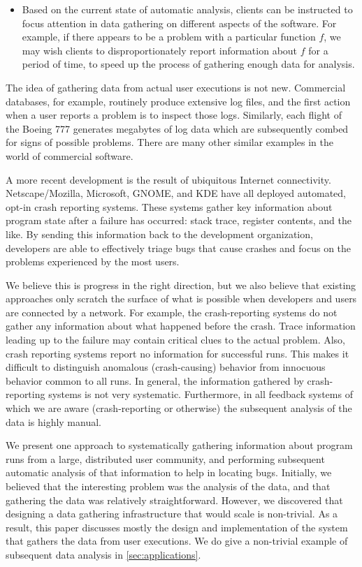 \begin{itemize}
\item Based on the current state of automatic analysis, clients can be
instructed to focus attention in data gathering on different aspects
of the software.  For example, if there appears to be a problem
with a particular function $f$, we may wish clients to disproportionately
report information about $f$ for a period of time, to speed up
the process of gathering enough data for analysis.

\end{itemize}

The idea of gathering data from actual user executions is not new.
Commercial databases, for example, routinely produce extensive
log files, and the first action when a user reports a problem is
to inspect those logs.  Similarly, each flight of the Boeing 777
generates megabytes of log data which are subsequently combed
for signs of possible problems.  There are many other similar
examples in the world of commercial software.

A more recent development is the result of ubiquitous Internet
connectivity.  Netscape/Mozilla, Microsoft, GNOME, and KDE have all
deployed automated, opt-in crash reporting systems.  These systems
gather key information about program state after a failure has
occurred: stack trace, register contents, and the like.  By sending
this information back to the development organization, developers are
able to effectively triage bugs that cause crashes and focus on the
problems experienced by the most users.

We believe this is progress in the right direction, but we also
believe that existing approaches only scratch the surface of what
is possible when developers and users are connected by a network.
For example, the crash-reporting systems do not gather any information
about what happened before the crash.  Trace information
leading up to the failure may contain critical clues to the actual
problem.  Also, crash reporting systems
report no information for successful runs.  This makes it difficult to
distinguish anomalous (crash-causing) behavior from innocuous behavior
common to all runs.  In general, the information gathered by 
crash-reporting systems is not very systematic.  Furthermore, in all
feedback systems of which we are aware (crash-reporting or otherwise)
the subsequent analysis of the data is highly manual.

We present one approach to systematically gathering information
about program runs from a large, distributed user community, and
performing subsequent automatic analysis of that information to
help in locating bugs.  Initially, we believed that the interesting
problem was the analysis of the data, and that gathering the
data was relatively straightforward.  However, we discovered that
designing a data gathering infrastructure that would scale is
non-trivial.  As a result, this paper discusses mostly the design
and implementation of the system that gathers the data from user
executions. We do give a non-trivial example of subsequent data analysis
in \autoref{sec:applications}.

